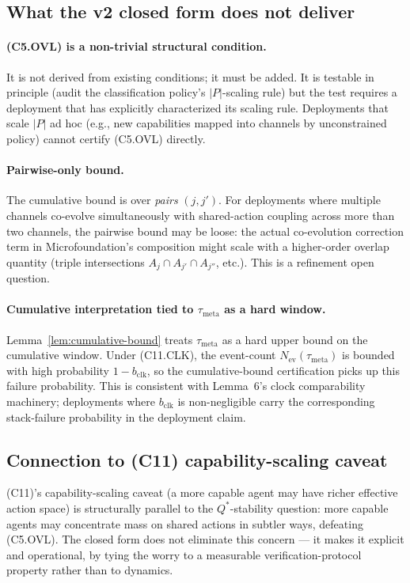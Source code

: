 \documentclass{article}
\newcommand{\Nev}{N_{\mathrm{ev}}}
\newcommand{\taumeta}{\tau_{\mathrm{meta}}}
\begin{document}
\subsection{What the v2 closed form does not deliver}

\paragraph{(C5.OVL) is a non-trivial structural condition.}  It is
not derived from existing conditions; it must be added.  It is
testable in principle (audit the classification policy's
$|P|$-scaling rule) but the test requires a deployment that has
explicitly characterized its scaling rule.  Deployments that scale
$|P|$ ad hoc (e.g., new capabilities mapped into channels by
unconstrained policy) cannot certify (C5.OVL) directly.

\paragraph{Pairwise-only bound.}  The cumulative bound is over
\emph{pairs} $(j, j')$.  For deployments where multiple channels
co-evolve simultaneously with shared-action coupling across more
than two channels, the pairwise bound may be loose: the actual
co-evolution correction term in Microfoundation's composition might
scale with a higher-order overlap quantity (triple intersections
$A_j \cap A_{j'} \cap A_{j''}$, etc.).  This is a refinement open
question.

\paragraph{Cumulative interpretation tied to $\taumeta$ as a hard
window.}  Lemma~\ref{lem:cumulative-bound} treats $\taumeta$ as a
hard upper bound on the cumulative window.  Under (C11.CLK), the
event-count $\Nev(\taumeta)$ is bounded with high probability $1 -
b_{\mathrm{clk}}$, so the cumulative-bound certification picks up
this failure probability.  This is consistent with Lemma~6's clock
comparability machinery; deployments where $b_{\mathrm{clk}}$ is
non-negligible carry the corresponding stack-failure probability in
the deployment claim.

\subsection{Connection to (C11) capability-scaling caveat}

(C11)'s capability-scaling caveat (a more capable agent may have
richer effective action space) is structurally parallel to the
$Q^*$-stability question: more capable agents may concentrate mass
on shared actions in subtler ways, defeating (C5.OVL).  The closed
form does not eliminate this concern --- it makes it explicit and
operational, by tying the worry to a measurable
verification-protocol property rather than to dynamics.
\end{document}
